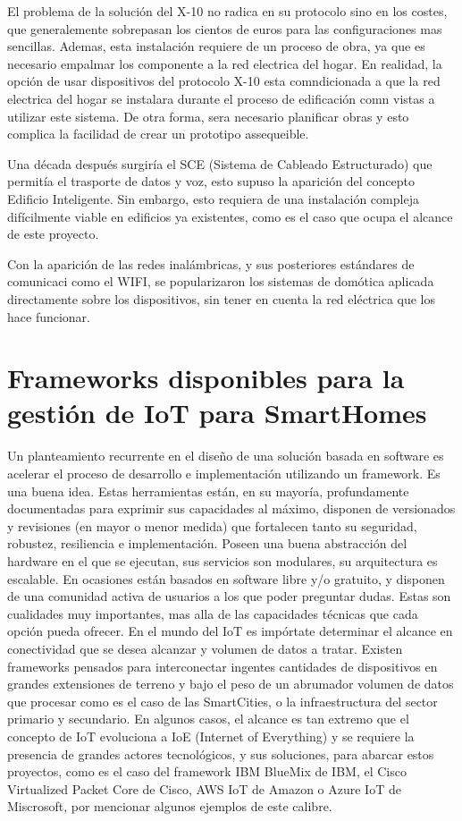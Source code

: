El problema de la solución del X-10 no radica en su protocolo sino en los costes, que generalemente sobrepasan los cientos de euros para las configuraciones mas sencillas. Ademas, esta instalación requiere de un proceso de obra, ya que es necesario empalmar los componente a la red electrica del hogar. En realidad, la opción de usar dispositivos del protocolo X-10 esta comndicionada a que la red electrica del hogar se instalara durante el proceso de edificación comn vistas a utilizar este sistema. De otra forma, sera necesario planificar obras y esto complica la facilidad de crear un prototipo assequeible.

Una década después surgiría el SCE (Sistema de Cableado Estructurado) que permitía el trasporte de datos y voz, esto supuso la aparición del concepto Edificio Inteligente. Sin embargo, esto requiera de una instalación compleja difícilmente viable en edificios ya existentes, como es el caso que ocupa el alcance de este proyecto.

Con la aparición de las redes inalámbricas, y sus posteriores estándares de comunicaci como el WIFI, se popularizaron los sistemas de domótica aplicada directamente sobre los dispositivos, sin tener en cuenta la red eléctrica que los hace funcionar.


\section{Frameworks disponibles para la gestión de IoT para SmartHomes}
\label{ch:Capitulo2.1}

Un planteamiento recurrente en el diseño de una solución basada en software es acelerar el proceso de desarrollo e implementación utilizando un framework. Es una buena idea. Estas herramientas están, en su mayoría, profundamente documentadas para exprimir sus capacidades al máximo, disponen de versionados y revisiones (en mayor o menor medida) que fortalecen tanto su seguridad, robustez, resiliencia e implementación. Poseen una buena abstracción del hardware en el que se ejecutan, sus servicios son modulares, su arquitectura es escalable.  En ocasiones están basados en software libre y/o gratuito, y disponen de una comunidad activa de usuarios a los que poder preguntar dudas. Estas son cualidades muy importantes, mas alla de las capacidades técnicas que cada opción pueda ofrecer.
En el mundo del IoT es impórtate determinar el alcance en conectividad que se desea alcanzar y volumen de datos a tratar. Existen frameworks pensados para interconectar ingentes cantidades de dispositivos en grandes extensiones de terreno y bajo el peso de un abrumador volumen de datos que procesar como es el caso de las SmartCities, o la infraestructura del sector primario y secundario. En algunos casos, el alcance es tan extremo que el concepto de IoT evoluciona a IoE (Internet of Everything) y se requiere la presencia de grandes actores tecnológicos, y sus soluciones, para abarcar estos proyectos, como es el caso del framework IBM BlueMix de IBM, el Cisco Virtualized Packet Core de Cisco, AWS IoT de Amazon o Azure IoT de Miscrosoft, por mencionar algunos ejemplos de este calibre.

